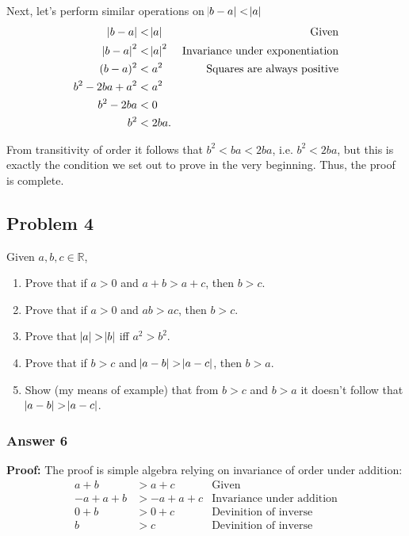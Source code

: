 \documentclass[11pt]{article}
\begin{document}
Next, let's perform similar operations on $\abs{b-a}<\abs{a}$
\begin{equation*}
  \begin{aligned}
    \abs{b - a}     &< \abs{a}
    & \textrm{Given} \\
    \abs{b - a}^2   &< \abs{a}^2
    & \textrm{Invariance under exponentiation} \\
    (b - a)^2       &< a^2
    & \textrm{Squares are always positive} \\
    b^2 - 2ba + a^2 &< a^2 \\
    b^2 - 2ba       &< 0 \\
    b^2             &< 2ba.
    \end{aligned}
\end{equation*}


From transitivity of order it follows that $b^2 < ba < 2ba$, i.e.
$b^2 < 2ba$, but this is exactly the condition we set out to prove in the
very beginning.  Thus, the proof is complete.
\subsection{Problem 4}
\label{sec-1-4}
Given $a, b, c \in \mathbb{R}$,
\begin{enumerate}
\item Prove that if $a > 0$ and $a + b > a + c$, then $b > c$.
\item Prove that if $a > 0$ and $ab > ac$, then $b > c$.
\item Prove that $\abs{a} > \abs{b}$ iff $a^2 > b^2$.
\item Prove that if $b > c$ and $\abs{a-b} > \abs{a-c}$, then $b > a$.
\item Show (my means of example) that from $b > c$ and $b > a$ it doesn't
follow that $\abs{a-b} > \abs{a-c}$.
\end{enumerate}

\subsubsection{Answer 6}
\label{sec-1-4-1}
\textbf{Proof:} The proof is simple algebra relying on invariance of order
under addition:
\begin{equation*}
  \begin{aligned}
    a+b    &> a+c    & \textrm{Given} \\
    -a+a+b &> -a+a+c & \textrm{Invariance under addition} \\
    0+b    &> 0+c    & \textrm{Devinition of inverse} \\
    b      &> c      & \textrm{Devinition of inverse}
  \end{aligned}
\end{equation*}
\end{document}
